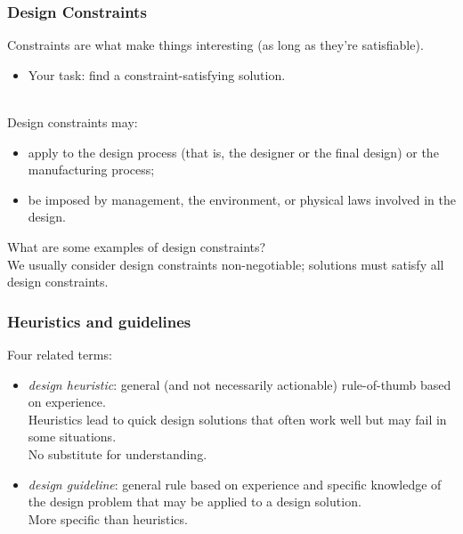 \begin{frame}
\frametitle{Design Constraints}

\begin{changemargin}{1cm}
Constraints are what make things interesting
(as long as they're satisfiable). 
\begin{itemize}
\item Your task: find a constraint-satisfying
solution.
\end{itemize}
~\\

Design constraints may:
\begin{itemize}
\item apply to the design process (that is, the
designer or the final design) or the manufacturing process; 
\item be imposed by management, the environment, or physical laws involved
in the design.
\end{itemize}

\alert{What are some examples of design constraints?}\\[1em]

We usually consider design constraints non-negotiable; solutions must
satisfy all design constraints.
\end{changemargin}

\end{frame}

\begin{frame}
\frametitle{Heuristics and guidelines}

\begin{changemargin}{1cm}
Four related terms:
\begin{itemize}
\item \emph{design heuristic}: general (and not necessarily
actionable) rule-of-thumb based on experience.  \\[1em]

Heuristics lead to
quick design solutions that often work well but may fail in some
situations. \\[1em]

No substitute for understanding.\\[1em]

\item \emph{design guideline}: general rule based on experience and
specific knowledge of the design problem that may be applied to a design
solution. \\[1em]

More specific than heuristics.
\end{itemize}
\end{changemargin}

\end{frame}

